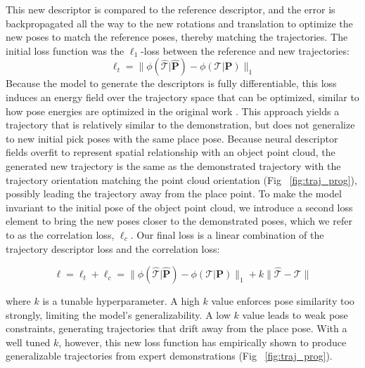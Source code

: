 \documentclass[10pt,twocolumn,letterpaper]{article}
\begin{document}
This new descriptor is compared to the reference descriptor, and the error is backpropagated all the way to the new rotations and translation to optimize the new poses to match the reference poses, thereby matching the trajectories. The initial loss function was the $\ell_1$-loss between the reference and new trajectories: 
\begin{equation}
\ell_t = \|\phi(\hat{\mathcal{T}}|\hat{\mathbf{P}}) - \phi(\mathcal{T}|\mathbf{P})\|_1
\end{equation}
Because the model to generate the descriptors is fully differentiable, this loss induces an energy field over the trajectory space that can be optimized, similar to how pose energies are optimized in the original work \cite{simeonovdu2021ndf}. 
This approach yields a trajectory that is relatively similar to the demonstration, but does not generalize to new initial pick poses with the same place pose. Because neural descriptor fields overfit to represent spatial relationship with an object point cloud, the generated new trajectory is the same as the demonstrated trajectory with the trajectory orientation matching the point cloud orientation (Fig ~\ref{fig:traj_prog}), possibly leading the trajectory away from the place point. 
To make the model invariant to the initial pose of the object point cloud, we introduce a second loss element to bring the new poses closer to the demonstrated poses, which we refer to as the correlation loss, $\ell_c$. Our final loss is a linear combination of the trajectory descriptor loss and the correlation loss:

\begin{equation}
\ell = \ell_t + \ell_c = \|\phi(\hat{\mathcal{T}}|\hat{\mathbf{P}}) - \phi(\mathcal{T}|\mathbf{P})\|_1 + k\|\hat{\mathcal{T}} - \mathcal{T}\|
\end{equation}

where $k$ is a tunable hyperparameter. A high $k$ value enforces pose similarity too strongly, limiting the model's generalizability. A low $k$ value leads to weak pose constraints, generating trajectories that drift away from the place pose. With a well tuned $k$, however, this new loss function has empirically shown to produce generalizable trajectories from expert demonstrations (Fig ~\ref{fig:traj_prog}).
\end{document}
